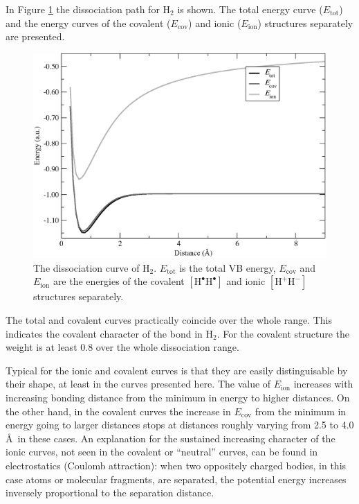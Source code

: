 In Figure \ref{ch3.fig.h2_c} the dissociation path for H$_2$ is shown. The total energy curve ($E_\mathrm{tot}$) and the energy curves of the covalent ($E_\mathrm{cov}$) and ionic ($E_\mathrm{ion}$) structures separately are presented. 
\begin{figure}[htbp]
\begin{center}
\includegraphics[scale=0.6]{dissociation/figures/h2_g.eps}
\end{center}
\caption{The dissociation curve of H$_2$. $E_\mathrm{tot}$ is the total VB energy, $E_\mathrm{cov}$  and $E_\mathrm{ion}$ are the energies of the covalent $[\mathrm{H^\bullet H^\bullet}]$ and ionic $[\mathrm{H^{+}H^{-}}]$ structures separately.}
\label{ch3.fig.h2_c}
\end{figure}
The total and covalent curves practically coincide over the whole range. This indicates the covalent character of the bond in H$_2$. For the covalent structure the weight is at least 0.8 over the whole dissociation range.

Typical for the ionic and covalent curves is that they are easily distinguisable by their shape, at least in the curves presented here. The value of $E_\mathrm{ion}$ increases with increasing bonding distance from the minimum in energy to higher distances. On the other hand, in the covalent curves the increase in $E_\mathrm{cov}$ from the minimum in energy going to larger distances stops at distances roughly varying from 2.5 to 4.0 \AA\ in these cases. An explanation for the sustained increasing character of the ionic curves, not seen in the covalent or ``neutral'' curves, can be found in electrostatics (Coulomb attraction): when two oppositely charged bodies, in this case atoms or molecular fragments, are separated, the potential energy increases inversely proportional to the separation distance.

